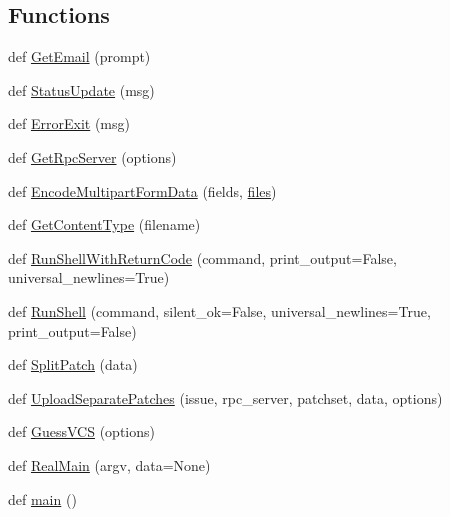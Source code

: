 \subsection*{Functions}
\begin{DoxyCompactItemize}
\item 
def \hyperlink{namespaceupload_a4f169469a6d43221ebd38cfd546484e1}{Get\+Email} (prompt)
\item 
def \hyperlink{namespaceupload_a79ce84c196c018f3b0c7ff7a9b626b58}{Status\+Update} (msg)
\item 
def \hyperlink{namespaceupload_adea53186a1d73e92cc839b7c35c2c044}{Error\+Exit} (msg)
\item 
def \hyperlink{namespaceupload_a1dadef480a702dbc5d0fb66203b9abe7}{Get\+Rpc\+Server} (options)
\item 
def \hyperlink{namespaceupload_ae12985a2c860c124c502dd2099b702eb}{Encode\+Multipart\+Form\+Data} (fields, \hyperlink{files_8js_a0742cac2750bccc2d88ac080fb9daa22}{files})
\item 
def \hyperlink{namespaceupload_a753a004706d964335ad218628e07b063}{Get\+Content\+Type} (filename)
\item 
def \hyperlink{namespaceupload_afa542d3a5a4f4fce174a1c23644a9204}{Run\+Shell\+With\+Return\+Code} (command, print\+\_\+output=False, universal\+\_\+newlines=True)
\item 
def \hyperlink{namespaceupload_adddc423c49132e8879cbb25d6be2cf11}{Run\+Shell} (command, silent\+\_\+ok=False, universal\+\_\+newlines=True, print\+\_\+output=False)
\item 
def \hyperlink{namespaceupload_a9dd260785ca4cc97e245234811ef1949}{Split\+Patch} (data)
\item 
def \hyperlink{namespaceupload_a7ec83cb7f7bfb9109c19b6f91552b3ee}{Upload\+Separate\+Patches} (issue, rpc\+\_\+server, patchset, data, options)
\item 
def \hyperlink{namespaceupload_a31390568253accd22ee51861eaeb99bd}{Guess\+V\+CS} (options)
\item 
def \hyperlink{namespaceupload_ad6226af96c9f1905602b8002bd5de952}{Real\+Main} (argv, data=None)
\item 
def \hyperlink{namespaceupload_aef3fcf7a8d77d13ba75adbf58b6c43ee}{main} ()
\end{DoxyCompactItemize}
